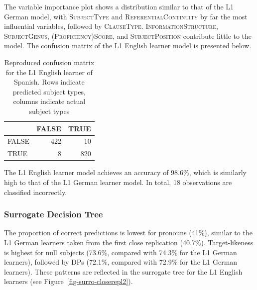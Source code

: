 \documentclass[
  letterpaper,
  DIV=11,
  numbers=noendperiod]{scrartcl}
\begin{document}
The variable importance plot shows a distribution similar to that of the
L1 German model, with \textsc{SubjectType} and
\textsc{ReferentialContinuity} by far the most influential variables,
followed by \textsc{ClauseType. InformationStructure, SubjectGenus,
(Proficiency)Score,} and \textsc{SubjectPosition} contribute little to
the model. The confusion matrix of the L1 English learner model is
presented below.

{

\begin{longtable}[]{@{}lrr@{}}

\caption{\label{tbl-model-accuracy-closerepl2}Reproduced confusion
matrix for the L1 English learner of Spanish. Rows indicate predicted
subject types, columns indicate actual subject types}

\tabularnewline

\toprule\noalign{}
& FALSE & TRUE \\
\midrule\noalign{}
\endhead
\bottomrule\noalign{}
\endlastfoot
FALSE & 422 & 10 \\
TRUE & 8 & 820 \\

\end{longtable}

}

The L1 English learner model achieves an accuracy of 98.6\%, which is
similarly high to that of the L1 German learner model. In total, 18
observations are classified incorrectly.

\subsubsection{Surrogate Decision Tree}\label{surrogate-decision-tree}

The proportion of correct predictions is lowest for pronouns (41\%),
similar to the L1 German learners taken from the first close replication
(40.7\%). Target-likeness is highest for null subjects (73.6\%, compared
with 74.3\% for the L1 German learners), followed by DPs (72.1\%,
compared with 72.9\% for the L1 German learners). These patterns are
reflected in the surrogate tree for the L1 English learners (see
Figure~\ref{fig-surro-closerepl2}).
\end{document}
